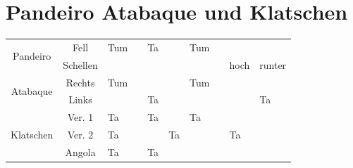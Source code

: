 \documentclass[fontsize=14pt, paper=a4, twoside, DIV=20]{scrreprt} %
\begin{document}
{\section*{Pandeiro Atabaque und Klatschen}
\begin{center}
    \centering
    \begin{tabularx}{\textwidth}{|c|c|X|X|X|X|X|X|X|X|}
        \hline
        \multirow{2}{*}{Pandeiro}         & Fell        & \cellcolor{green}Tum  &            & \cellcolor{orange}Ta &                     & \cellcolor{green}Tum  &            &                         &                          \\ \cline{2-10}
                                          & Schellen    &                       &            &                      &                     &                       &            & \cellcolor{yellow}hoch  & \cellcolor{yellow}runter \\ \hline \hline
               \multirow{2}{*}{Atabaque}  & Rechts      & \cellcolor{yellow}Tum &            &                      &                     & \cellcolor{yellow}Tum &            &                         &                          \\ \cline{2-10}
                                          & Links       &                       &            & \cellcolor{orange}Ta &                     &                       &            &                         & \cellcolor{orange}Ta     \\ \hline \hline
               \multirow{3}{*}{Klatschen} & Ver. 1      & \cellcolor{green}Ta   &            & \cellcolor{green}Ta  &                     & \cellcolor{green}Ta   &            &                         &                          \\ \cline{2-10}
                                          & Ver. 2      & \cellcolor{green}Ta   &            &                      & \cellcolor{green}Ta &                       &            & \cellcolor{green}Ta     &                          \\ \cline{2-10}
                                          & Angola      &  \cellcolor{green}Ta                        &            & \cellcolor{green}Ta &                     &                       &            &                         & \\ \hline \hline

\end{tabularx}
\end{center}}
\end{document}
